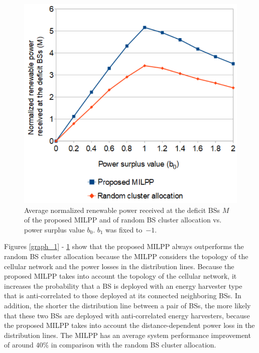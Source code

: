 \begin{figure}[H]
\centering
\includegraphics[width=0.75\columnwidth]{pictures/graph_5}
\caption[Average normalized renewable power received at the deficit BSs $M$ of the proposed MILPP and of random BS cluster allocation vs. power surplus value $b_0$]{Average normalized renewable power received at the deficit BSs $M$ of the proposed MILPP and of random BS cluster allocation vs. power surplus value $b_0$. $b_1$ was fixed \mbox{to $-1$.}\label{graph_4}}
\end{figure}

Figures \ref{graph_1} - \ref{graph_4} show that the proposed MILPP always outperforms the random BS cluster allocation because the MILPP considers the
topology of the cellular network and the power losses in the distribution lines. Because the proposed MILPP takes into account the topology of the cellular network,
it increases the probability that a BS is deployed with an energy harvester type that is anti-correlated to those deployed at its connected neighboring BSs. In addition, the shorter the distribution line between a pair of BSs, the more likely that these two BSs are deployed with anti-correlated energy harvesters, because the proposed MILPP takes into account the distance-dependent power loss in the distribution lines. The MILPP has an average system performance improvement of around $40\%$ in comparison with the random BS cluster allocation.





